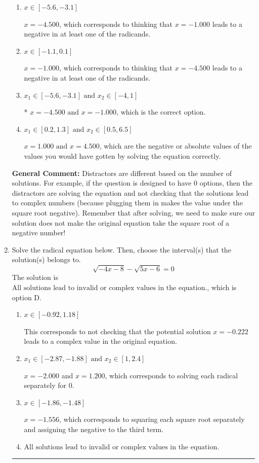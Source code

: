 \documentclass{extbook}[14pt]
\newcommand{\litem}[1]{\item #1

\rule{\textwidth}{0.4pt}}
\begin{document}
\begin{enumerate}
{\begin{enumerate}[label=\Alph*.]
Corresponds to thinking that $x = -4.500 \text{ and } x = -1.000$ lead to negatives in at least one of the radicands.
\item \( x \in [-5.6,-3.1] \)

$x = -4.500$, which corresponds to thinking that $x = -1.000$ leads to a negative in at least one of the radicands.
\item \( x \in [-1.1,0.1] \)

$x = -1.000$, which corresponds to thinking that $x = -4.500$ leads to a negative in at least one of the radicands.
\item \( x_1 \in [-5.6, -3.1] \text{ and } x_2 \in [-4,1] \)

* $x = -4.500 \text{ and } x = -1.000$, which is the correct option.
\item \( x_1 \in [0.2, 1.3] \text{ and } x_2 \in [0.5,6.5] \)

$x = 1.000 \text{ and } x = 4.500$, which are the negative or absolute values of the values you would have gotten by solving the equation correctly.
\end{enumerate}

\textbf{General Comment:} Distractors are different based on the number of solutions. For example, if the question is designed to have 0 options, then the distractors are solving the equation and not checking that the solutions lead to complex numbers (because plugging them in makes the value under the square root negative). Remember that after solving, we need to make sure our solution does not make the original equation take the square root of a negative number!
}
\litem{
Solve the radical equation below. Then, choose the interval(s) that the solution(s) belongs to.
\[ \sqrt{-4 x - 8} - \sqrt{5 x - 6} = 0 \]The solution is \( \text{All solutions lead to invalid or complex values in the equation.} \), which is option D.\begin{enumerate}[label=\Alph*.]
\item \( x \in [-0.92,1.18] \)

This corresponds to not checking that the potential solution $x = -0.222$ leads to a complex value in the original equation.
\item \( x_1 \in [-2.87, -1.88] \text{ and } x_2 \in [1,2.4] \)

$x = -2.000$ and $x = 1.200$, which corresponds to solving each radical separately for 0.
\item \( x \in [-1.86,-1.48] \)

$x = -1.556$, which corresponds to squaring each square root separately and assigning the negative to the third term.
\item \( \text{All solutions lead to invalid or complex values in the equation.} \)


\end{enumerate}}
\end{enumerate}
\end{document}
